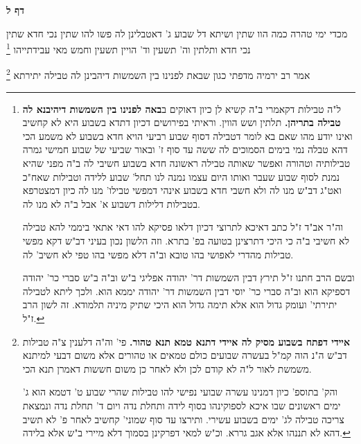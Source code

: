 \documentclass[12pt, openany]{book}
\newcommand{\sethebfont}{
\fontsize{10.5pt}{21.0pt} \selectfont
}
\newcommand{\twocol}[1]{
	{\sethebfont \begin{multicols}{2}
			#1
	\end{multicols}}	
}
\newcommand{\sectname}{}
\newcommand{\newsection}[1]{
	\addcontentsline{toc}{section}{#1}
	\renewcommand{\sectname}{#1}	
	\vspace{-\baselineskip}
	\begin{center}
		\textbf{%
\fontsize{16pt}{16pt}\selectfont
			#1}
	\end{center}
	\vspace{-\baselineskip}
	\nopagebreak
}
\newcommand{\footnotecomment}[1]{\footnote{#1}}
\newcommand{\commenta}[1]{\footnotecomment{#1}}
\begin{document}
\newsection{דף ל}
\twocol{מכדי ימי טהרה כמה הוו שתין ושיתא דל שבוע ג' דאטבלינן לה פשו להו שתין נכי חדא שתין נכי חדא ותלתין וה' תשעין וד' הויין תשעין וחמש מאי עבידתייהו 
\commenta{ ל"ה טבילות דקאמרי ב"ה קשיא לן כיון דאוקים ב\textbf{באה לפנינו בין השמשות דיהיבנא לה טבילה בתריהן.}  תלתין ושש הווין. וראיתי בפירושים דכיון דתדא בשבוע היא לא קחשיב ואינו יודע מהו שאם בא לומר דטבילה דסוף שבוע רביעי הויא חדא בשבוע לא משמע הכי דהא טבלה נמי בימים הסמוכים לה ששה עד סוף ז' ובאור שביעי של שבוע חמישי גמרה טבילותיה וטהורה ואפשר שאותה טבילה ראשונה חדא בשבוע חשיבי לה ב"ה מפני שהיא נמנת לסוף שבוע שעבר ואותו היום עצמו נמנה לנו תחל' שבוע ללידה וטבילות שאח"כ ואט"ג דב"ש מנו לה ולא חשבי חדא בשבוע אינהי דמפשי טבילו' מנו לה כיון דמצטרפא בטבילות דלילות דשבוע א' אבל ב"ה לא מנו לה.\par  וה"ר אב"ד ז"ל כתב דאיכא לתרוצי דכיון דלאו פסיקא להו דאי אתאי ביממי להא טבילה לא חשיבי ב"ה כי היכי דתרצינן בטועה בפ' בתרא. וזה הלשון נכון בעיני דב"ש דקא מפשי טבילות מהדרי לאפושי בהו טובא וב"ה דלא מפשי בהו טפי לא חשיב' לה.\par  ובשם הרב חתנו ז"ל תירץ דבין השמשות דר' יהודה אפליגי ב"ש וב"ה ב"ש סברי כר' יהודה דספיקא הוא וב"ה סברי כר' יוסי דבין השמשות דר' יהודה יממא הוא. ולכך ליתא לטבילה יתירתי' ועומק גדול הוא אלא תימה גדול הוא היכי שתיק מיניה תלמודא. זה לשון הרב ז"ל. }

אמר רב ירמיה מדפתי  כגון שבאת לפנינו בין השמשות דיהבינן לה טבילה יתירתא 
\commenta{\textbf{איידי דפתח בשבוע מסיק לה איידי דתנא טמא תנא טהור.}  פי' וה"ה דלענין צ"ה טבילות דב"ש ה"נ הוה קמ"ל בעשרה שבועים כולם טמאים או טהורים אלא משום דבעי למיתנא משמשת לאור ל"ה לא קודם לכן ולא לאחר כן משום חששות דאמרן תנא הכי.\par והק' בתוספ' כיון דמנינו עשרה שבועי נפישי להו טבילות שהרי שבוע ט' דטמא הוא ג' ימים ראשונים שבו איכא לספוקינהו בסוף לידה ותחלת נדה ויום ד' תחלת נדה ונמצאת צריכה טבילה לג' ימים בשבוע עשירי. ותירצו עד סוף שמוני' קחשיב לאחר פ' לא תשיב דהא לא תננהו אלא אגב גררא. וכ"ש למאי דפרקינן בסמוך דלא מיירי ב"ש אלא בלידה. }

}
\end{document}
